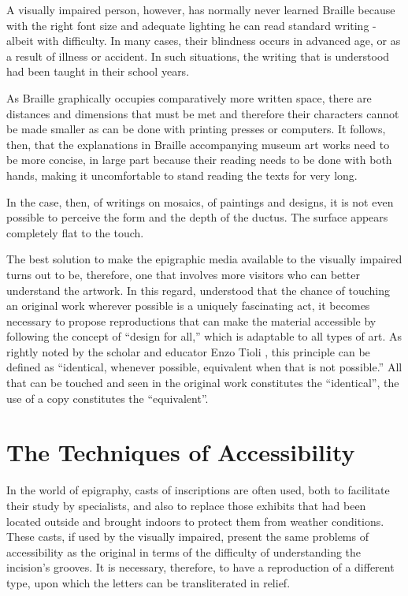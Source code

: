 \documentclass[amsthm,ebook]{saparticle}
\begin{document}
A visually impaired person, however, has normally never learned Braille because with the right font size and adequate
lighting he can read standard writing - albeit with difficulty. In many cases, their blindness occurs in advanced age,
or as a result of illness or accident. In such situations, the writing that is understood had been taught in their
school years.

As Braille graphically occupies comparatively more written space, there are distances and dimensions that must be met
and therefore their characters cannot be made smaller as can be done with printing presses or computers. It follows,
then, that the explanations in Braille accompanying museum art works need to be more concise, in large part because
their reading needs to be done with both hands, making it uncomfortable to stand reading the texts for very long.

In the case, then, of writings on mosaics, of paintings and designs, it is not even possible to perceive the form and
the depth of the ductus. The surface appears completely flat to the touch.

The best solution to make the epigraphic media available to the visually impaired turns out to be, therefore, one that
involves more visitors who can better understand the artwork. In this regard, understood that the chance of
touching an original work wherever possible is a uniquely fascinating act, it becomes necessary to propose
reproductions that can make the material accessible by following the concept of ``design for all,'' which is adaptable to
all types of art. As rightly noted by the scholar and educator Enzo Tioli \citep{Tioli2006},
this principle can be defined as ``identical, whenever possible, equivalent when that is not possible.'' All that can be
touched and seen in the original work constitutes the ``identical'', the use of a copy constitutes the ``equivalent''.







\section{The Techniques of Accessibility}
\noindent In the world of epigraphy, casts of inscriptions are often used, both to facilitate their study by specialists,
and also to replace those exhibits that had been located outside and brought indoors to protect them from weather
conditions. These casts, if used by the visually impaired, present the same problems of accessibility as the original
in terms of the difficulty of understanding the incision’s grooves. It is necessary, therefore, to have a reproduction
of a different type, upon which the letters can be transliterated in relief.
\end{document}
